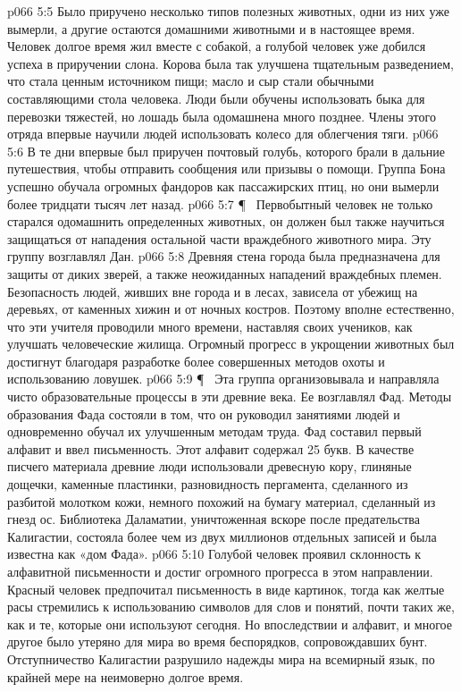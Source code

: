 \vs p066 5:5 Было приручено несколько типов полезных животных, одни из них уже вымерли, а другие остаются домашними животными и в настоящее время. Человек долгое время жил вместе с собакой, а голубой человек уже добился успеха в приручении слона. Корова была так улучшена тщательным разведением, что стала ценным источником пищи; масло и сыр стали обычными составляющими стола человека. Люди были обучены использовать быка для перевозки тяжестей, но лошадь была одомашнена много позднее. Члены этого отряда впервые научили людей использовать колесо для облегчения тяги.
\vs p066 5:6 В те дни впервые был приручен почтовый голубь, которого брали в дальние путешествия, чтобы отправить сообщения или призывы о помощи. Группа Бона успешно обучала огромных фандоров как пассажирских птиц, но они вымерли более тридцати тысяч лет назад.
\vs p066 5:7 \P\ \bibnobreakspace {} Первобытный человек не только старался одомашнить определенных животных, он должен был также научиться защищаться от нападения остальной части враждебного животного мира. Эту группу возглавлял Дан.
\vs p066 5:8 Древняя стена города была предназначена для защиты от диких зверей, а также неожиданных нападений враждебных племен. Безопасность людей, живших вне города и в лесах, зависела от убежищ на деревьях, от каменных хижин и от ночных костров. Поэтому вполне естественно, что эти учителя проводили много времени, наставляя своих учеников, как улучшать человеческие жилища. Огромный прогресс в укрощении животных был достигнут благодаря разработке более совершенных методов охоты и использованию ловушек.
\vs p066 5:9 \P\ \bibnobreakspace {} Эта группа организовывала и направляла чисто образовательные процессы в эти древние века. Ее возглавлял Фад. Методы образования Фада состояли в том, что он руководил занятиями людей и одновременно обучал их улучшенным методам труда. Фад составил первый алфавит и ввел письменность. Этот алфавит содержал 25 букв. В качестве писчего материала древние люди использовали древесную кору, глиняные дощечки, каменные пластинки, разновидность пергамента, сделанного из разбитой молотком кожи, немного похожий на бумагу материал, сделанный из гнезд ос. Библиотека Даламатии, уничтоженная вскоре после предательства Калигастии, состояла более чем из двух миллионов отдельных записей и была известна как «дом Фада».
\vs p066 5:10 Голубой человек проявил склонность к алфавитной письменности и достиг огромного прогресса в этом направлении. Красный человек предпочитал письменность в виде картинок, тогда как желтые расы стремились к использованию символов для слов и понятий, почти таких же, как и те, которые они используют сегодня. Но впоследствии и алфавит, и многое другое было утеряно для мира во время беспорядков, сопровождавших бунт. Отступничество Калигастии разрушило надежды мира на всемирный язык, по крайней мере на неимоверно долгое время.
